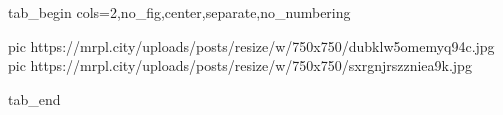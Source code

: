  
 
 
 
 


\ifcmt
  tab_begin cols=2,no_fig,center,separate,no_numbering

     pic https://mrpl.city/uploads/posts/resize/w/750x750/dubklw5omemyq94c.jpg
		 pic https://mrpl.city/uploads/posts/resize/w/750x750/sxrgnjrszzniea9k.jpg

  tab_end
\fi
